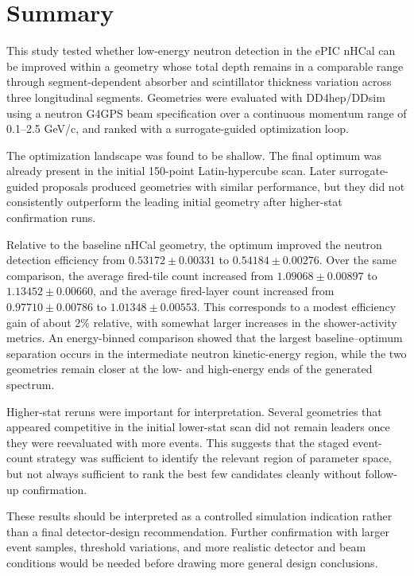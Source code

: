 \section{Summary}\label{sec:summary}

\noindent This study tested whether low-energy neutron detection in the ePIC nHCal can be improved within a geometry whose total depth remains in a comparable range through segment-dependent absorber and scintillator
thickness variation across three longitudinal segments. Geometries were evaluated with DD4hep/DDsim using a neutron G4GPS beam specification over a continuous momentum range of 0.1--2.5 GeV/c,
and ranked with a surrogate-guided optimization loop.

\noindent The optimization landscape was found to be shallow. The final optimum was already present in the initial 150-point Latin-hypercube scan. Later surrogate-guided proposals
produced geometries with similar performance, but they did not consistently outperform the leading initial geometry after higher-stat confirmation runs.

\noindent Relative to the baseline nHCal geometry, the optimum improved the neutron detection efficiency from $0.53172 \pm 0.00331$ to $0.54184 \pm 0.00276$. Over the same comparison,
the average fired-tile count increased from $1.09068 \pm 0.00897$ to $1.13452 \pm 0.00660$, and the average fired-layer count increased from $0.97710 \pm 0.00786$ to $1.01348 \pm 0.00553$. This corresponds to a modest efficiency
gain of about $2\%$ relative, with somewhat larger increases in the shower-activity metrics. An energy-binned comparison showed that the largest baseline--optimum separation occurs in the intermediate neutron kinetic-energy region, while the two geometries remain closer at the low- and high-energy ends of the generated spectrum.

\noindent Higher-stat reruns were important for interpretation. Several geometries that appeared competitive in the initial lower-stat scan did not remain leaders once they were
reevaluated with more events. This suggests that the staged event-count strategy was sufficient to identify the relevant region of parameter space, but not always sufficient to
rank the best few candidates cleanly without follow-up confirmation.

\noindent These results should be interpreted as a controlled simulation indication rather than a final detector-design recommendation. Further confirmation with larger event samples, threshold variations, and more realistic detector and beam conditions would be needed before drawing more general design conclusions.
